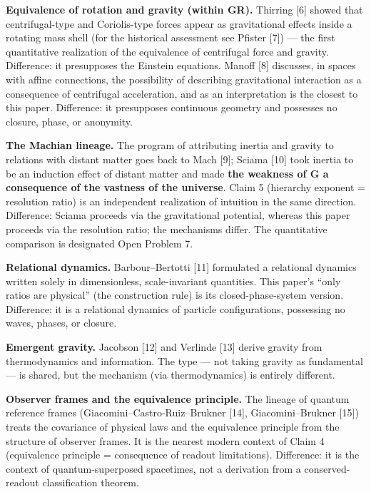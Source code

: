 \documentclass[
  a4paper,
]{article}
\begin{document}
\textbf{Equivalence of rotation and gravity (within GR).} Thirring
{[}6{]} showed that centrifugal-type and Coriolis-type forces appear as
gravitational effects inside a rotating mass shell (for the historical
assessment see Pfister {[}7{]}) --- the first quantitative realization
of the equivalence of centrifugal force and gravity. Difference: it
presupposes the Einstein equations. Manoff {[}8{]} discusses, in spaces
with affine connections, the possibility of describing gravitational
interaction as a consequence of centrifugal acceleration, and as an
interpretation is the closest to this paper. Difference: it presupposes
continuous geometry and possesses no closure, phase, or anonymity.

\textbf{The Machian lineage.} The program of attributing inertia and
gravity to relations with distant matter goes back to Mach {[}9{]};
Sciama {[}10{]} took inertia to be an induction effect of distant matter
and made \textbf{the weakness of G a consequence of the vastness of the
universe}. Claim 5 (hierarchy exponent = resolution ratio) is an
independent realization of intuition in the same direction. Difference:
Sciama proceeds via the gravitational potential, whereas this paper
proceeds via the resolution ratio; the mechanisms differ. The
quantitative comparison is designated Open Problem 7.

\textbf{Relational dynamics.} Barbour--Bertotti {[}11{]} formulated a
relational dynamics written solely in dimensionless, scale-invariant
quantities. This paper's ``only ratios are physical'' (the construction
rule) is its closed-phase-system version. Difference: it is a relational
dynamics of particle configurations, possessing no waves, phases, or
closure.

\textbf{Emergent gravity.} Jacobson {[}12{]} and Verlinde {[}13{]}
derive gravity from thermodynamics and information. The type --- not
taking gravity as fundamental --- is shared, but the mechanism (via
thermodynamics) is entirely different.

\textbf{Observer frames and the equivalence principle.} The lineage of
quantum reference frames (Giacomini--Castro-Ruiz--Brukner {[}14{]},
Giacomini--Brukner {[}15{]}) treats the covariance of physical laws and
the equivalence principle from the structure of observer frames. It is
the nearest modern context of Claim 4 (equivalence principle =
consequence of readout limitations). Difference: it is the context of
quantum-superposed spacetimes, not a derivation from a conserved-readout
classification theorem.
\end{document}
